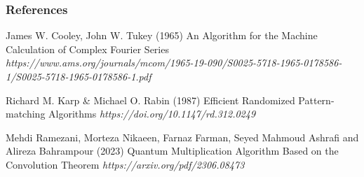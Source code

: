 \documentclass[
	11pt, %
]{beamer}
\begin{document}

\begin{frame} %
    \frametitle{References}

    \begin{thebibliography}{99} %
        \footnotesize %

        James W. Cooley, John W. Tukey (1965)
        \newblock An Algorithm for the Machine Calculation of Complex Fourier Series
        \newblock \emph{https://www.ams.org/journals/mcom/1965-19-090/S0025-5718-1965-0178586-1/S0025-5718-1965-0178586-1.pdf}

        Richard M. Karp \& Michael O. Rabin (1987)
        \newblock Efficient Randomized Pattern-matching Algorithms
        \newblock \emph{https://doi.org/10.1147/rd.312.0249}

        Mehdi Ramezani, Morteza Nikaeen, Farnaz Farman, Seyed Mahmoud Ashrafi and Alireza Bahrampour (2023)
        \newblock Quantum Multiplication Algorithm Based on the Convolution Theorem
        \newblock \emph{https://arxiv.org/pdf/2306.08473}

    \end{thebibliography}
\end{frame}
\end{document}
